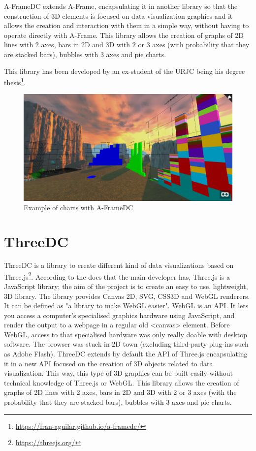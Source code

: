 \documentclass[a4paper, 12pt]{book}
\begin{document}
A-FrameDC extends A-Frame, encapsulating it in another library so that the construction of 3D elements is focused on data visualization graphics and it allows the creation and interaction with them in a simple way, without having to operate directly with A-Frame. This library allows the creation of graphs of 2D lines with 2 axes, bars in 2D and 3D with 2 or 3 axes (with probability that they are stacked bars), bubbles with 3 axes and pie charts.

This library has been developed by an ex-student of the URJC being his degree thesis\footnote{\url{https://fran-aguilar.github.io/a-framedc/}}.

\begin{figure}[H]
  \centering
  \includegraphics[width=16cm, keepaspectratio]{img/context/aframedc.PNG}
  \caption{Example of charts with A-FrameDC}
  \label{fig:pluginhtml}
\end{figure}



\section{ThreeDC}
\label{sec:threedc}

ThreeDC is a library to create different kind of data visualizations based on Three.js\footnote{\url{https://threejs.org/}}. According to the docs that the main developer has, Three.js is a JavaScript library; the aim of the project is to create an easy to use, lightweight, 3D library. The library provides Canvas 2D, SVG, CSS3D and WebGL renderers. It can be defined as "a library to make WebGL easier". 
WebGL is an API. It lets you access a computer's specialised graphics hardware using JavaScript, and render the output to a webpage in a regular old <canvas> element. Before WebGL, access to that specialised hardware was only really doable with desktop software. The browser was stuck in 2D town (excluding third-party plug-ins such as Adobe Flash).
ThreeDC extends by default the API of Three.js encapsulating it in a new API focused on the creation of 3D objects related to data visualization. This way, this type of 3D graphics can be built easily without technical knowledge of Three.js or WebGL. This library allows the creation of graphs of 2D lines with 2 axes, bars in 2D and 3D with 2 or 3 axes (with the probability that they are stacked bars), bubbles with 3 axes and pie charts.
\end{document}
